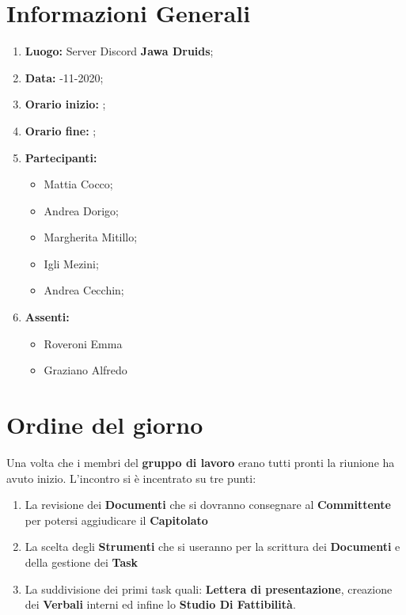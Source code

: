 \newpage
	\section{Informazioni Generali}
	\begin{enumerate}
		\item \textbf{Luogo:} \normalfont Server Discord \textbf{Jawa Druids};
		\item \textbf{Data:} -11-2020;
		\item \textbf{Orario inizio:} ;
		\item \textbf{Orario fine:} ;
		\item \textbf{Partecipanti:}
		\begin{itemize}
			\item Mattia Cocco; 
			\item Andrea Dorigo;
			\item Margherita Mitillo;
			\item Igli Mezini;
			\item Andrea Cecchin;
		\end{itemize}
		\item \textbf{Assenti:}
		\begin{itemize}
			\item Roveroni Emma
			\item Graziano Alfredo
		\end{itemize}
	\end{enumerate}
	\section{Ordine del giorno}
	Una volta che i membri del \textbf{gruppo di lavoro} erano tutti pronti la riunione ha avuto inizio.
	L'incontro si è incentrato su tre punti:
	\begin{enumerate}
		\item La revisione dei \textbf{Documenti} che si dovranno consegnare al \textbf{Committente} per potersi aggiudicare il \textbf{Capitolato}
		
		\item La scelta degli \textbf{Strumenti} che si useranno per la scrittura dei \textbf{Documenti} e della gestione dei \textbf{Task}
		
		\item La suddivisione dei primi task quali: \textbf{Lettera di presentazione}, creazione dei \textbf{Verbali} interni ed infine lo \textbf{Studio Di Fattibilità}.
	\end{enumerate}

